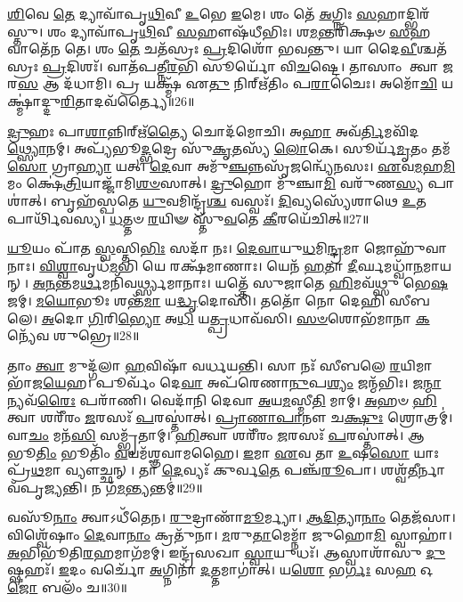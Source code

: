 \-\ul{𑌶𑌿}\-𑌵𑍇 \ul{𑌤𑍇} 𑌦𑍍𑌯𑌾𑌵𑌾᳴𑌪𑍃\-\ul{𑌥𑌿}\-𑌵𑍀 \ul{𑌉}\-𑌭𑍇 \ul{𑌇}\-𑌮𑍇।
𑌶𑌂 𑌤𑍇᳴ \ul{𑌅}\-𑌗𑍍𑌨𑌿𑌃 \ul{𑌸}\-𑌹𑌾𑌦𑍍𑌭𑌿𑌰᳴𑌸𑍍𑌤𑍁।
𑌶𑌂 𑌦𑍍𑌯𑌾𑌵𑌾᳴𑌪𑍃\-\ul{𑌥𑌿}\-𑌵𑍀 \ul{𑌸}\-𑌹𑍗𑌷᳴𑌧𑍀𑌭𑌿𑌃।
𑌶\-\ul{𑌮}\-𑌨𑍍𑌤𑌰𑌿᳴𑌕𑍍𑌷𑍞 \ul{𑌸}\-𑌹 𑌵𑌾𑌤𑍇᳴𑌨 𑌤𑍇।
𑌶𑌂 \ul{𑌤𑍇} 𑌚𑌤᳴𑌸𑍍𑌰𑌃 \ul{𑌪𑍍𑌰}\-𑌦𑌿𑌶𑍋᳴ 𑌭𑌵𑌨𑍍𑌤𑍁।
𑌯𑌾 𑌦𑍈\-\ul{𑌵𑍀}\-𑌶𑍍𑌚𑌤᳴𑌸𑍍𑌰𑌃 \ul{𑌪𑍍𑌰}\-𑌦𑌿𑌶𑌃᳴।
𑌵𑌾𑌤᳴𑌪𑌤𑍍𑌨𑍀\-\ul{𑌰}\-𑌭𑌿 𑌸𑍂𑌰𑍍𑌯𑍋᳴ 𑌵𑌿\-\ul{𑌚}\-𑌷𑍍𑌟𑍇।
𑌤𑌾𑌸𑌾𑌂 𑌤𑍍𑌵𑌾 \ul{𑌜}\-𑌰\-\ul{𑌸} 𑌆 𑌦᳴𑌧𑌾𑌮𑌿।
𑌪𑍍𑌰 𑌯𑌕𑍍𑌷𑍍𑌮᳴ 𑌏\-\ul{𑌤𑍁} 𑌨𑌿𑌰𑍍\mbox{}𑌋᳴𑌤𑌿𑌂 𑌪\-\ul{𑌰𑌾}\-𑌚𑍈𑌃।
𑌅𑌮𑍋᳴\-\ul{𑌚𑌿} 𑌯𑌕𑍍𑌷𑍍𑌮𑌾॑𑌦𑍍𑌦𑍁\-\ul{𑌰𑌿}\-𑌤𑌾𑌦𑌵᳴𑌰𑍍𑌤𑍍𑌯𑍈॥26॥

\-\ul{𑌦𑍍𑌰𑍁}\-𑌹𑌃 𑌪𑌾\-\ul{𑌶𑌾}\-𑌨𑍍𑌨𑌿𑌰𑍍\mbox{}𑌋᳴\-\ul{𑌤𑍍𑌯𑍈} 𑌚𑍋𑌦᳴𑌮𑍋𑌚𑌿।
𑌅\-\ul{𑌹𑌾} 𑌅𑌵᳴\-\ul{𑌰𑍍𑌤𑌿}\-𑌮𑌵𑌿᳴𑌦\-\ul{𑌥𑍍𑌸𑍍𑌯𑍋}\-𑌨𑌮𑍍।
𑌅𑌪𑍍𑌯᳴𑌭𑍂\-\ul{𑌦𑍍𑌭}\-𑌦𑍍𑌰𑍇 𑌸𑍁᳴\-\ul{𑌕𑍃}\-𑌤𑌸𑍍𑌯᳴ \ul{𑌲𑍋}\-𑌕𑍇।
𑌸𑍂𑌰𑍍𑌯᳴\-\ul{𑌮𑍃}\-𑌤𑌂 𑌤𑌮᳴\-\ul{𑌸𑍋} 𑌗𑍍𑌰𑌾\-\ul{𑌹𑍍𑌯𑌾} 𑌯𑌤𑍍।
\-\ul{𑌦𑍇}\-𑌵𑌾 𑌅𑌮𑍁᳴\-\ul{𑌞𑍍𑌚}\-𑌨𑍍𑌨𑌸𑍃᳴\-\ul{𑌜}\-𑌨𑍍𑌵𑍍𑌯𑍇᳴𑌨𑌸𑌃।
\-\ul{𑌏}\-𑌵\-\ul{𑌮}\-𑌹\-\ul{𑌮𑌿}\-𑌮𑌂 𑌕𑍍𑌷𑍇॑\-\ul{𑌤𑍍𑌰𑌿}\-𑌯𑌾𑌜𑍍𑌜𑌾᳴𑌮𑌿\-\ul{𑌶}\-\-\ul{𑍞}\-𑌸𑌾𑌤𑍍।
\-\ul{𑌦𑍍𑌰𑍁}\-𑌹𑍋 𑌮𑍁᳴𑌞𑍍𑌚𑌾\-\ul{𑌮𑌿} 𑌵𑌰𑍁᳴𑌣\-\ul{𑌸𑍍𑌯} 𑌪𑌾𑌶𑌾॑𑌤𑍍।
𑌬𑍃𑌹᳴𑌸𑍍𑌪𑌤𑍇 \ul{𑌯𑍁}\-𑌵𑌮𑌿𑌨𑍍𑌦𑍍𑌰᳴\-\ul{𑌶𑍍𑌚} 𑌵𑌸𑍍𑌵𑌃᳴।
\-\ul{𑌦𑌿}\-𑌵𑍍𑌯𑌸𑍍𑌯𑍇᳴𑌶𑌾𑌥𑍇 \ul{𑌉}\-𑌤 𑌪𑌾𑌰𑍍𑌥𑌿᳴𑌵𑌸𑍍𑌯।
\-\ul{𑌧}\-𑌤𑍍𑌤𑍞 \ul{𑌰}\-𑌯𑌿𑍟 𑌸𑍍𑌤𑍁᳴\-\ul{𑌵}\-𑌤𑍇 \ul{𑌕𑍀}\-𑌰𑌯𑍇᳴𑌚𑌿𑌤𑍍॥27॥

\-\ul{𑌯𑍂}\-𑌯𑌂 𑌪𑌾᳴𑌤 \ul{𑌸𑍍𑌵}\-𑌸𑍍𑌤𑌿\-\ul{𑌭𑌿𑌃} 𑌸𑌦𑌾᳴ 𑌨𑌃।
\-\ul{𑌦𑍇}\-\-\ul{𑌵𑌾}\-𑌯𑍁\-\ul{𑌧}\-𑌮𑌿\-\ul{𑌨𑍍𑌦𑍍𑌰}\-𑌮𑌾 𑌜𑍋𑌹𑍁᳴𑌵𑌾𑌨𑌾𑌃।
\-\ul{𑌵𑌿}\-\-\ul{𑌶𑍍𑌵𑌾}\-𑌵𑍃𑌧᳴\-\ul{𑌮}\-𑌭𑌿 𑌯𑍇 𑌰𑌕𑍍𑌷᳴𑌮𑌾𑌣𑌾𑌃।
𑌯𑍇𑌨᳴ \ul{𑌹}\-𑌤𑌾 \ul{𑌦𑍀}\-𑌰𑍍𑌘𑌮𑌧𑍍𑌵𑌾᳴\-\ul{𑌨}\-𑌮𑌾𑌯𑌨𑍍।
\-\ul{𑌅}\-\-\ul{𑌨}\-𑌨𑍍𑌤𑌮\-\ul{𑌰𑍍𑌥}\-𑌮𑌨𑌿᳴𑌵𑌰𑍍𑌥𑍍𑌸𑍍𑌯𑌮𑌾𑌨𑌾𑌃।
𑌯𑌤𑍍𑌤𑍇᳴ 𑌸𑍁𑌜𑌾𑌤𑍇 \ul{𑌹𑌿}\-𑌮𑌵᳴𑌥𑍍𑌸𑍁 𑌭𑍇\-\ul{𑌷}\-𑌜𑌮𑍍।
\-\ul{𑌮}\-\-\ul{𑌯𑍋}\-𑌭𑍂𑌃 𑌶𑌨𑍍𑌤᳴\-\ul{𑌮𑌾} 𑌯\-\ul{𑌦𑍍𑌧𑍃}\-𑌦𑍋𑌸𑌿᳴।
𑌤𑌤𑍋᳴ 𑌨𑍋 𑌦𑍇𑌹𑌿 𑌸𑍀𑌬𑌲𑍇।
\-\ul{𑌅}\-𑌦𑍋 \ul{𑌗𑌿}\-𑌰𑌿\-\ul{𑌭𑍍𑌯𑍋} 𑌅\-\ul{𑌧𑌿} 𑌯\-\ul{𑌤𑍍𑌪𑍍𑌰}\-𑌧𑌾𑌵᳴𑌸𑌿।
\-\ul{𑌸}\-\-\ul{𑍞}\-𑌶𑍋𑌭᳴𑌮𑌾𑌨𑌾 \ul{𑌕}\-𑌨𑍍𑌯𑍇᳴𑌵 𑌶𑍁𑌭𑍍𑌰𑍇॥28॥

𑌤𑌾𑌂 \ul{𑌤𑍍𑌵𑌾} 𑌮𑍁𑌦𑍍𑌗᳴𑌲𑌾 \ul{𑌹}\-𑌵𑌿𑌷𑌾᳴ 𑌵𑌰𑍍𑌧𑌯𑌨𑍍𑌤𑌿।
𑌸𑌾 𑌨𑌃᳴ 𑌸𑍀𑌬𑌲𑍇 \ul{𑌰}\-𑌯𑌿𑌮𑌾 𑌭𑌾᳴𑌜\-\ul{𑌯𑍇}\-𑌹।
𑌪𑍂𑌰𑍍𑌵𑌂᳴ 𑌦𑍇\-\ul{𑌵𑌾} 𑌅𑌪᳴𑌰𑍇𑌣𑌾\-\ul{𑌨𑍁}\-𑌪\-\ul{𑌶𑍍𑌯𑌂} 𑌜𑌨𑍍𑌮᳴𑌭𑌿𑌃।
𑌜\-\ul{𑌨𑍍𑌮𑌾}\-𑌨𑍍𑌯𑌵᳴\-\ul{𑌰𑍈𑌃} 𑌪𑌰𑌾᳴𑌣𑌿।
𑌵𑍇𑌦𑌾᳴𑌨𑌿 𑌦𑍇𑌵𑌾 \ul{𑌅}\-𑌯\-\ul{𑌮}\-𑌸𑍍𑌮𑍀\-\ul{𑌤𑌿} 𑌮𑌾𑌮𑍍।
\-\ul{𑌅}\-𑌹𑍞 \ul{𑌹𑌿}\-𑌤𑍍𑌵𑌾 𑌶𑌰𑍀᳴𑌰𑌂 \ul{𑌜}\-𑌰𑌸𑌃᳴ \ul{𑌪}\-𑌰𑌸𑍍𑌤𑌾॑𑌤𑍍।
\-\ul{𑌪𑍍𑌰𑌾}\-\-\ul{𑌣𑌾}\-\-\ul{𑌪𑌾}\-𑌨𑍗 𑌚\-\ul{𑌕𑍍𑌷𑍁𑌃} 𑌶𑍍𑌰𑍋𑌤𑍍𑌰𑌮𑍍॑।
𑌵𑌾\-\ul{𑌚𑌂} 𑌮𑌨᳴\-\ul{𑌸𑌿} 𑌸𑌮𑍍𑌭𑍃᳴𑌤𑌾𑌮𑍍।
\-\ul{𑌹𑌿}\-𑌤𑍍𑌵𑌾 𑌶𑌰𑍀᳴𑌰𑌂 \ul{𑌜}\-𑌰𑌸𑌃᳴ \ul{𑌪}\-𑌰𑌸𑍍𑌤𑌾॑𑌤𑍍।
𑌆 𑌭𑍂\-\ul{𑌤𑌿𑌂} 𑌭𑍂𑌤𑌿𑌂᳴ \ul{𑌵}\-𑌯𑌮᳴𑌶𑍍𑌞𑌵𑌾𑌮𑌹𑍈।
\-\ul{𑌇}\-𑌮𑌾 \ul{𑌏}\-𑌵 𑌤𑌾 \ul{𑌉}\-𑌷\-\ul{𑌸𑍋} 𑌯𑌾𑌃 𑌪𑍍𑌰᳴\-\ul{𑌥}\-𑌮𑌾 𑌵𑍍𑌯𑍗𑌚𑍍𑌛𑌨𑍍।
𑌤𑌾 \ul{𑌦𑍇}\-𑌵𑍍𑌯𑌃᳴ 𑌕𑍁𑌰𑍍𑌵\-\ul{𑌤𑍇} 𑌪𑌞𑍍𑌚᳴\-\ul{𑌰𑍂}\-𑌪𑌾।
𑌶𑌶𑍍𑌵᳴\-\ul{𑌤𑍀}\-𑌰𑍍𑌨𑌾𑌵᳴𑌪𑍃𑌜𑍍𑌯𑌨𑍍𑌤𑌿।
𑌨 𑌗᳴\-\ul{𑌮}\-𑌨𑍍𑌤𑍍𑌯𑌨𑍍𑌤𑌮𑍍॑॥29॥\anuvakamend[\-\ul{𑌕}\-\-\ul{𑌰𑍋}\-𑌮𑍍𑌯𑌵᳴𑌰𑍍𑌤𑍍𑌯𑍈 𑌚𑌿𑌚𑍍𑌛𑍁𑌭𑍍𑌰𑍇\-𑌽𑌶𑍍𑌞𑌵𑌾𑌮𑌹𑍈 \ul{𑌚}\-𑌤𑍍𑌵𑌾𑌰𑌿᳴ 𑌚]

𑌵𑌸𑍂᳴\-\ul{𑌨𑌾𑌂} 𑌤𑍍𑌵𑌾\-𑌽𑌧𑍀᳴𑌤𑍇𑌨।
\-\ul{𑌰𑍁}\-𑌦𑍍𑌰𑌾𑌣𑌾᳴\-\ul{𑌮𑍂}\-𑌰𑍍𑌮𑍍𑌯𑌾।
\-\ul{𑌆}\-\-\ul{𑌦𑌿}\-𑌤𑍍𑌯𑌾\-\ul{𑌨𑌾𑌂} 𑌤𑍇𑌜᳴𑌸𑌾।
𑌵𑌿𑌶𑍍𑌵𑍇᳴𑌷𑌾𑌂 \ul{𑌦𑍇}\-𑌵𑌾\-\ul{𑌨𑌾𑌂} 𑌕𑍍𑌰𑌤𑍁᳴𑌨𑌾।
\-\ul{𑌮}\-𑌰𑍁\-\ul{𑌤𑌾}\-𑌮𑍇𑌮𑍍𑌨𑌾᳴ 𑌜𑍁𑌹𑍋\-\ul{𑌮𑌿} 𑌸𑍍𑌵𑌾𑌹𑌾॑।
\-\ul{𑌅}\-𑌭𑌿𑌭𑍂᳴𑌤𑌿\-\ul{𑌰}\-𑌹𑌮𑌾𑌗᳴𑌮𑌮𑍍।
𑌇𑌨𑍍𑌦𑍍𑌰᳴𑌸𑌖𑌾 \ul{𑌸𑍍𑌵𑌾}\-𑌯𑍁𑌧𑌃᳴।
𑌆𑌸𑍍𑌵𑌾𑌶𑌾᳴𑌸𑍁 \ul{𑌦𑍁}\-𑌷𑍍𑌷𑌹𑌃᳴।
\-\ul{𑌇}\-𑌦𑌂 𑌵𑌰𑍍𑌚𑍋᳴ \ul{𑌅}\-𑌗𑍍𑌨𑌿𑌨𑌾᳴ \ul{𑌦}\-𑌤𑍍𑌤𑌮𑌾𑌗𑌾॑𑌤𑍍।
𑌯\-\ul{𑌶𑍋} 𑌭\-\ul{𑌰𑍍𑌗𑌃} 𑌸\-\ul{𑌹} 𑌓\-\ul{𑌜𑍋} 𑌬𑌲𑌂᳴ 𑌚॥30॥

